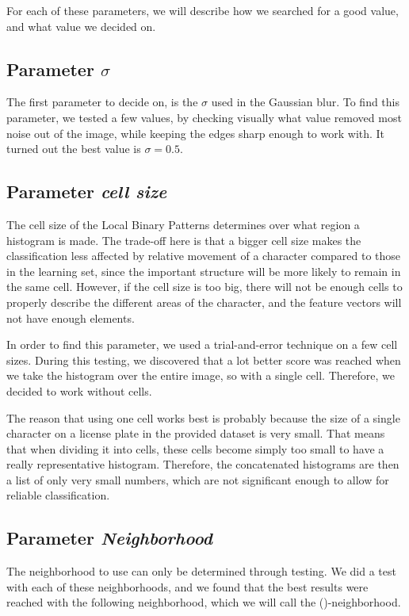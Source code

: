 \documentclass[a4paper]{article}
\begin{document}
For each of these parameters, we will describe how we searched for a good value,
and what value we decided on.


\subsection{Parameter $\sigma$}

The first parameter to decide on, is the $\sigma$ used in the Gaussian blur. To
find this parameter, we tested a few values, by checking visually what value
removed most noise out of the image, while keeping the edges sharp enough to
work with. It turned out the best value is $\sigma = 0.5$.


\subsection{Parameter \emph{cell size}}

The cell size of the Local Binary Patterns determines over what region a
histogram is made. The trade-off here is that a bigger cell size makes the
classification less affected by relative movement of a character compared to
those in the learning set, since the important structure will be more likely to
remain in the same cell. However, if the cell size is too big, there will not be
enough cells to properly describe the different areas of the character, and the
feature vectors will not have enough elements.

In order to find this parameter, we used a trial-and-error technique on a few
cell sizes. During this testing, we discovered that a lot better score was
reached when we take the histogram over the entire image, so with a single cell.
Therefore, we decided to work without cells.

The reason that using one cell works best is probably because the size of a
single character on a license plate in the provided dataset is very small. That
means that when dividing it into cells, these cells become simply too small to
have a really representative histogram. Therefore, the concatenated histograms
are then a list of only very small numbers, which are not significant enough to
allow for reliable classification.


\subsection{Parameter \emph{Neighborhood}}

The neighborhood to use can only be determined through testing. We did a test
with each of these neighborhoods, and we found that the best results were
reached with the following neighborhood, which we will call the ()-neighborhood.
\end{document}
